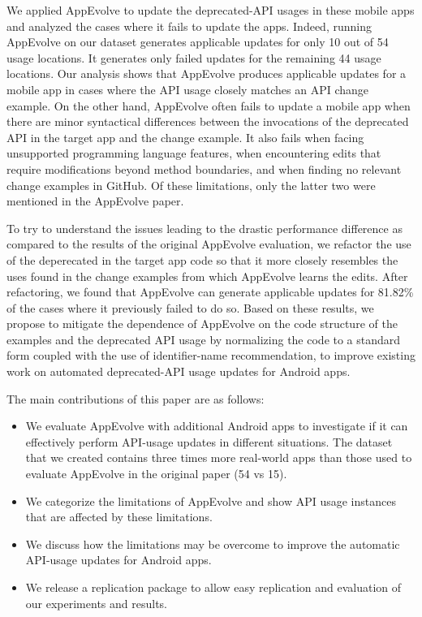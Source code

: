 We applied AppEvolve to update the deprecated-API usages in these mobile
apps and analyzed the cases where it fails to update the apps. Indeed,
running AppEvolve on our dataset generates applicable updates for only 10
out of 54 usage locations.  It generates only failed updates for the
remaining 44 usage locations. Our analysis shows that AppEvolve produces
applicable updates for a mobile app in cases where the API usage closely
matches an API change example.  On the other hand, AppEvolve often fails to
update a mobile app when there are minor syntactical differences between
the invocations of the deprecated API in the target app and the change
example.  It also fails when facing unsupported  programming language features, when encountering edits that
require modifications beyond method boundaries, and when finding no
relevant change examples in GitHub.  Of these limitations, only the latter
two were mentioned in the AppEvolve paper.

To try to understand the issues leading to the drastic performance
difference as compared to the results of the original AppEvolve evaluation,
we refactor the use of the deperecated in the target app code so that it
more closely resembles the uses found in the change examples from which
AppEvolve learns the edits.  After refactoring, we found that AppEvolve can
generate applicable updates for 81.82\% of the cases where it previously
failed to do so.  Based on these results, we propose to mitigate the
dependence of AppEvolve on the code structure of the examples and the
deprecated API usage by normalizing the code to a standard form coupled
with the use of identifier-name recommendation, to improve existing work on
automated deprecated-API usage updates for Android apps.

The main contributions of this paper are as follows:
\begin{itemize}
	\item We  evaluate AppEvolve with additional Android apps to investigate if it can effectively perform API-usage updates in different situations. The dataset that we created contains three times more real-world apps than those used to evaluate AppEvolve in the original paper (54 vs 15).
	\item We categorize the limitations of AppEvolve and show API usage
	instances that are affected by these limitations.
	\item We discuss how the limitations may be overcome to improve the automatic API-usage updates for Android apps.
	\item We release a replication package to allow easy replication
	and evaluation of our experiments and results. 
\end{itemize}

